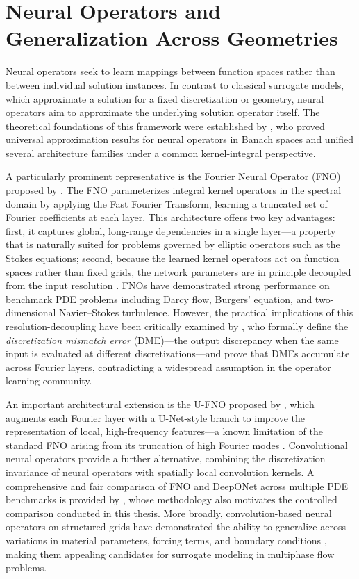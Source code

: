 \section{Neural Operators and Generalization Across Geometries}

Neural operators seek to learn mappings between function spaces rather than between individual solution instances. In contrast to classical surrogate models, which approximate a solution for a fixed discretization or geometry, neural operators aim to approximate the underlying solution operator itself. The theoretical foundations of this framework were established by \textcite{kovachki_neural_nodate}, who proved universal approximation results for neural operators in Banach spaces and unified several architecture families under a common kernel-integral perspective.

A particularly prominent representative is the Fourier Neural Operator (FNO) proposed by \textcite{li_fourier_2021}. The FNO parameterizes integral kernel operators in the spectral domain by applying the Fast Fourier Transform, learning a truncated set of Fourier coefficients at each layer. This architecture offers two key advantages: first, it captures global, long-range dependencies in a single layer—a property that is naturally suited for problems governed by elliptic operators such as the Stokes equations; second, because the learned kernel operators act on function spaces rather than fixed grids, the network parameters are in principle decoupled from the input resolution \parencite{li_fourier_2021}. FNOs have demonstrated strong performance on benchmark PDE problems including Darcy flow, Burgers' equation, and two-dimensional Navier--Stokes turbulence. However, the practical implications of this resolution-decoupling have been critically examined by \textcite{gao2025discretizationinvariance}, who formally define the \emph{discretization mismatch error} (DME)—the output discrepancy when the same input is evaluated at different discretizations—and prove that DMEs accumulate across Fourier layers, contradicting a widespread assumption in the operator learning community.

An important architectural extension is the U-FNO proposed by \textcite{wen_u-fnoenhanced_2022}, which augments each Fourier layer with a U-Net-style branch to improve the representation of local, high-frequency features—a known limitation of the standard FNO arising from its truncation of high Fourier modes \parencite{qin_toward_2024}. Convolutional neural operators \parencite{raonic_convolutional_2023} provide a further alternative, combining the discretization invariance of neural operators with spatially local convolution kernels. A comprehensive and fair comparison of FNO and DeepONet across multiple PDE benchmarks is provided by \textcite{lu_comprehensive_2022}, whose methodology also motivates the controlled comparison conducted in this thesis. More broadly, convolution-based neural operators on structured grids have demonstrated the ability to generalize across variations in material parameters, forcing terms, and boundary conditions \parencite{thuerey_deep_2020}, making them appealing candidates for surrogate modeling in multiphase flow problems.

